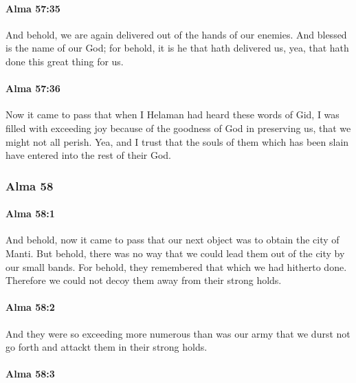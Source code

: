 		\paragraph{Alma 57:35} %
			\label{ALMA-57-35}

			And behold, we are again delivered out of the hands of our enemies.
			And blessed is the name of our God;
			for behold, it is he that hath delivered us,
			yea, that hath done this great thing for us.

		\paragraph{Alma 57:36} %
			\label{ALMA-57-36}

			Now it came to pass that when I Helaman had heard these words of Gid,
			I was filled with exceeding joy
			because of the goodness of God in preserving us, that we might not all perish.
			Yea, and I trust that the souls of them which has been slain
			have entered into the rest of their God.

	\subsubsection{Alma 58} %
		\label{ALMA-58}
		
		\paragraph{Alma 58:1} %
			\label{ALMA-58-1}

			And behold, now it came to pass that
			our next object was to obtain the city of Manti.
			But behold, there was no way
			that we could lead them out of the city by our small bands.
			For behold, they remembered that which we had hitherto done.
			Therefore we could not decoy them away from their strong holds.

		\paragraph{Alma 58:2} %
			\label{ALMA-58-2}

			And they were so exceeding more numerous than was our army
			that we durst not go forth and attackt them in their strong holds.

		\paragraph{Alma 58:3} %
			\label{ALMA-58-3}

